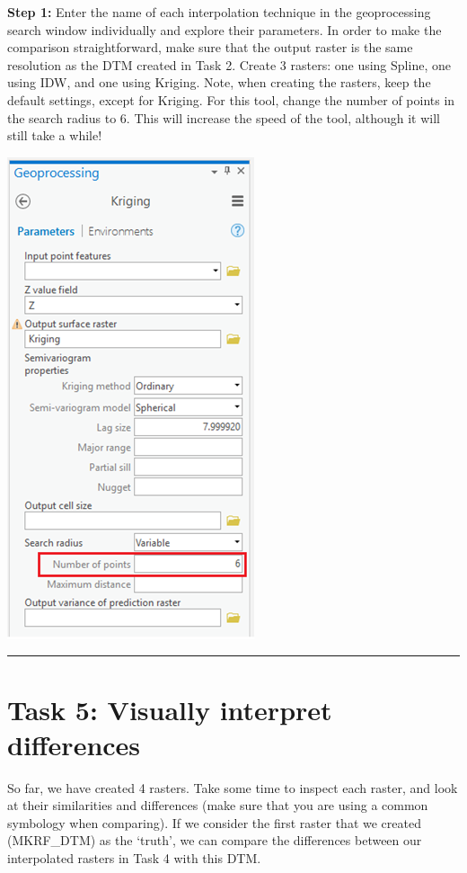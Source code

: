 \documentclass[
]{book}
\begin{document}
\textbf{Step 1:} Enter the name of each interpolation technique in the geoprocessing search window individually and explore their parameters. In order to make the comparison straightforward, make sure that the output raster is the same resolution as the DTM created in Task 2. Create 3 rasters: one using Spline, one using IDW, and one using Kriging. Note, when creating the rasters, keep the default settings, except for Kriging. For this tool, change the number of points in the search radius to 6. This will increase the speed of the tool, although it will still take a while!

\begin{center}\includegraphics[width=0.4\linewidth]{images/04-dtm-using-kriging} \end{center}

\begin{center}\rule{0.5\linewidth}{0.5pt}\end{center}

\hypertarget{task-5-visually-interpret-differences}{%
\section*{Task 5: Visually interpret differences}\label{task-5-visually-interpret-differences}}

So far, we have created 4 rasters. Take some time to inspect each raster, and look at their similarities and differences (make sure that you are using a common symbology when comparing). If we consider the first raster that we created (MKRF\_DTM) as the `truth', we can compare the differences between our interpolated rasters in Task 4 with this DTM.
\end{document}
